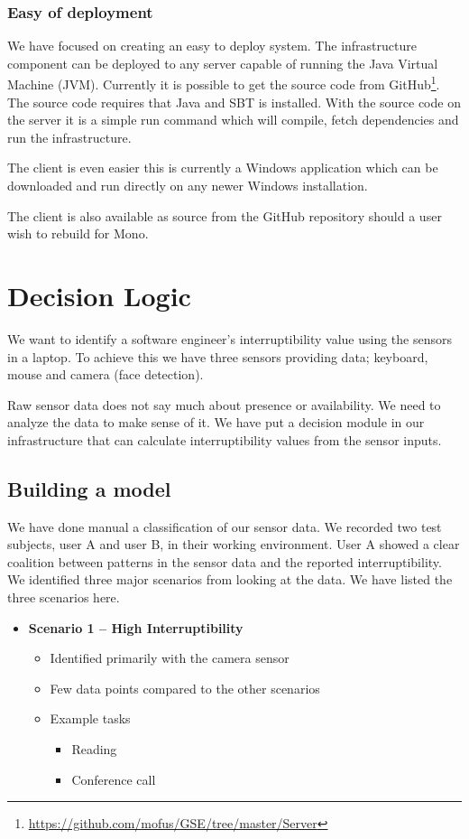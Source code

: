 \documentclass{sigchi}
\begin{document}
\subsubsection{Easy of deployment}
We have focused on creating an easy to deploy system.
The infrastructure component can be deployed to any server capable of running the Java Virtual Machine (JVM).
Currently it is possible to get the source code from GitHub\footnote{\url{https://github.com/mofus/GSE/tree/master/Server}}.
The source code requires that Java and SBT is installed.
With the source code on the server it is a simple run command which will compile, fetch dependencies and run the infrastructure.

The client is even easier this is currently a Windows application which can be downloaded and run directly on any newer Windows installation.

The client is also available as source from the GitHub repository should a user wish to rebuild for Mono.

\section{Decision Logic}
We want to identify a software engineer’s interruptibility value using the sensors in a laptop.
To achieve this we have three sensors providing data; keyboard, mouse and camera (face detection).

Raw sensor data does not say much about presence or availability.
We need to analyze the data to make sense of it.
We have put a decision module in our infrastructure that can calculate interruptibility values from the sensor inputs.

\subsection{Building a model}
We have done manual a classification of our sensor data.
We recorded two test subjects, user A and user B, in their working environment.
User A showed a clear coalition between patterns in the sensor data and the reported interruptibility.
We identified three major scenarios from looking at the data.
We have listed the three scenarios here.

\begin{itemize}
  \item \textbf{Scenario 1 – High Interruptibility}
  \begin{itemize}
    \item Identified primarily with the camera sensor
    \item Few data points compared to the other scenarios
    \item Example tasks
    \begin{itemize}
      \item Reading
      \item Conference call
    \end{itemize}
  \end{itemize}
\end{itemize}
\end{document}
